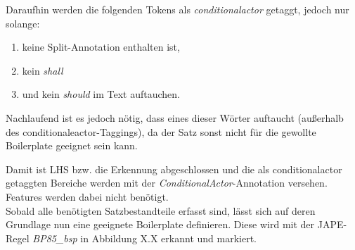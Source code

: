\documentclass[12pt]{report}
\begin{document}
Daraufhin werden die folgenden Tokens als \textit{conditionalactor} getaggt, jedoch nur solange:
\begin{enumerate}
\item keine Split-Annotation enthalten ist,
\item kein \textit{shall}
\item und kein \textit{should} im Text auftauchen.
\end{enumerate}

Nachlaufend ist es jedoch nötig, dass eines dieser Wörter auftaucht (außerhalb des conditionaleactor-Taggings), da der Satz sonst nicht für die gewollte Boilerplate geeignet sein kann.

Damit ist LHS bzw. die Erkennung abgeschlossen und die als conditionalactor getaggten Bereiche werden mit der \textit{ConditionalActor}-Annotation versehen. Features werden dabei nicht benötigt. \\

Sobald alle benötigten Satzbestandteile erfasst sind, lässt sich auf deren Grundlage nun eine geeignete Boilerplate definieren. Diese wird mit der JAPE-Regel \textit{BP85\_bsp} in Abbildung X.X erkannt und markiert. 
\end{document}
